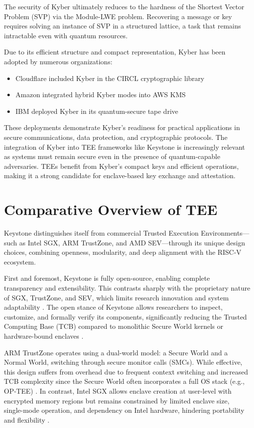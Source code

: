 The security of Kyber ultimately reduces to the hardness of the Shortest Vector Problem (SVP) via the Module-LWE problem. Recovering a message or key requires solving an instance of SVP in a structured lattice, a task that remains intractable even with quantum resources\cite{kyber2021}. %

Due to its efficient structure and compact representation, Kyber has been adopted by numerous organizations:
\begin{itemize}
    \item Cloudflare included Kyber in the CIRCL cryptographic library
    \item Amazon integrated hybrid Kyber modes into AWS KMS
    \item IBM deployed Kyber in its quantum-secure tape drive
\end{itemize} %
These deployments demonstrate Kyber’s readiness for practical applications in secure communications, data protection, and cryptographic protocols. 
The integration of Kyber into TEE frameworks like Keystone is increasingly relevant as systems must remain secure even in the presence of quantum-capable adversaries. TEEs benefit from Kyber’s compact keys and efficient operations, making it a strong candidate for enclave-based key exchange and attestation.

\section{Comparative Overview of TEE}
\label{sec:comparison_tees}

Keystone distinguishes itself from commercial Trusted Execution Environments—such as Intel SGX, ARM TrustZone, and AMD SEV—through its unique design choices, combining openness, modularity, and deep alignment with the RISC‑V ecosystem.

First and foremost, Keystone is fully open-source, enabling complete transparency and extensibility. This contrasts sharply with the proprietary nature of SGX, TrustZone, and SEV, which limits research innovation and system adaptability \cite{turn0search0}. The open stance of Keystone allows researchers to inspect, customize, and formally verify its components, significantly reducing the Trusted Computing Base (TCB) compared to monolithic Secure World kernels or hardware-bound enclaves \cite{turn0search0}.

ARM TrustZone operates using a dual-world model: a Secure World and a Normal World, switching through secure monitor calls (SMCs). While effective, this design suffers from overhead due to frequent context switching and increased TCB complexity since the Secure World often incorporates a full OS stack (e.g., OP‑TEE) \cite{turn0search0}. In contrast, Intel SGX allows enclave creation at user-level with encrypted memory regions but remains constrained by limited enclave size, single-mode operation, and dependency on Intel hardware, hindering portability and flexibility \cite{turn0search0}.

